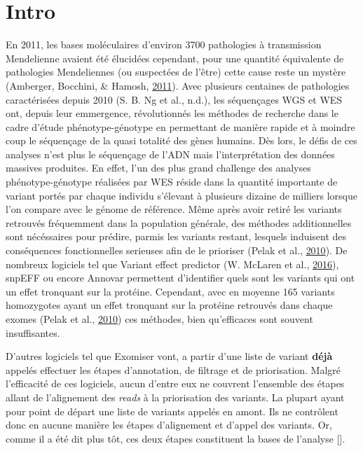 \documentclass[12pt,twoside]{reedthesis}
\theoremstyle{definition}
\theoremstyle{definition}
\theoremstyle{remark}
\begin{document}
  \newpage
  
  \section{Intro}\label{intro}
  
  En 2011, les bases moléculaires d'environ 3700 pathologies à
  transmission Mendelienne avaient été élucidées cependant, pour une
  quantité équivalente de pathologies Mendeliennes (ou suspectées de
  l'être) cette cause reste un mystère (Amberger, Bocchini, \& Hamosh,
  \protect\hyperlink{ref-Amberger2011}{2011}). Avec plusieurs centaines de
  pathologies caractérisées depuis 2010 (S. B. Ng et al., n.d.), les
  séquençages WGS et WES ont, depuis leur emmergence, révolutionnés les
  méthodes de recherche dans le cadre d'étude phénotype-génotype en
  permettant de manière rapide et à moindre coup le séquençage de la quasi
  totalité des gènes humains. Dès lors, le défis de ces analyses n'est
  plus le séquençage de l'ADN mais l'interprétation des données massives
  produites. En effet, l'un des plus grand challenge des analyses
  phénotype-génotype réalisées par WES réside dans la quantité importante
  de variant portés par chaque individu s'élevant à plusieurs dizaine de
  milliers lorsque l'on compare avec le génome de référence. Même après
  avoir retiré les variants retrouvés fréquemment dans la population
  générale, des méthodes additionnelles sont nécéssaires pour prédire,
  parmis les variants restant, lesquels induisent des conséquences
  fonctionnelles serieuses afin de le prioriser (Pelak et al.,
  \protect\hyperlink{ref-Pelak2010}{2010}). De nombreux logiciels tel que
  Variant effect predictor (W. McLaren et al.,
  \protect\hyperlink{ref-McLaren2016}{2016}), snpEFF ou encore Annovar
  permettent d'identifier quels sont les variants qui ont un effet
  tronquant sur la protéine. Cependant, avec en moyenne 165 variants
  homozygotes ayant un effet tronquant sur la protéine retrouvés dans
  chaque exomes (Pelak et al., \protect\hyperlink{ref-Pelak2010}{2010})
  ces méthodes, bien qu'efficaces sont souvent insuffisantes.
  
  D'autres logiciels tel que Exomiser vont, a partir d'une liste de
  variant \textbf{déjà} appelés effectuer les étapes d'annotation, de
  filtrage et de priorisation. Malgré l'efficacité de ces logiciels, aucun
  d'entre eux ne couvrent l'ensemble des étapes allant de l'alignement des
  \emph{reads} à la priorisation des variants. La plupart ayant pour point
  de départ une liste de variants appelés en amont. Ils ne contrôlent donc
  en aucune manière les étapes d'alignement et d'appel des variants. Or,
  comme il a été dit plus tôt, ces deux étapes constituent la bases de
  l'analyse {[}{]}.
  
\end{document}
